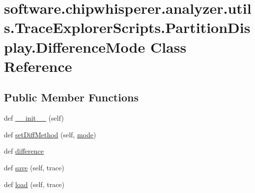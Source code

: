 \hypertarget{classsoftware_1_1chipwhisperer_1_1analyzer_1_1utils_1_1TraceExplorerScripts_1_1PartitionDisplay_1_1DifferenceMode}{}\section{software.\+chipwhisperer.\+analyzer.\+utils.\+Trace\+Explorer\+Scripts.\+Partition\+Display.\+Difference\+Mode Class Reference}
\label{classsoftware_1_1chipwhisperer_1_1analyzer_1_1utils_1_1TraceExplorerScripts_1_1PartitionDisplay_1_1DifferenceMode}
\subsection*{Public Member Functions}
\begin{DoxyCompactItemize}
\item 
def \hyperlink{classsoftware_1_1chipwhisperer_1_1analyzer_1_1utils_1_1TraceExplorerScripts_1_1PartitionDisplay_1_1DifferenceMode_ac95af7f58a38e1dabe01edbc47f40ac0}{\+\_\+\+\_\+init\+\_\+\+\_\+} (self)
\item 
def \hyperlink{classsoftware_1_1chipwhisperer_1_1analyzer_1_1utils_1_1TraceExplorerScripts_1_1PartitionDisplay_1_1DifferenceMode_a47991e7827b698607e369f43a2687a70}{set\+Diff\+Method} (self, \hyperlink{classsoftware_1_1chipwhisperer_1_1analyzer_1_1utils_1_1TraceExplorerScripts_1_1PartitionDisplay_1_1DifferenceMode_a877d514ea60f264b7e82f6077d12d67a}{mode})
\item 
def \hyperlink{classsoftware_1_1chipwhisperer_1_1analyzer_1_1utils_1_1TraceExplorerScripts_1_1PartitionDisplay_1_1DifferenceMode_a28304848515eee73c57ecd33e8ae71e8}{difference}
\item 
def \hyperlink{classsoftware_1_1chipwhisperer_1_1analyzer_1_1utils_1_1TraceExplorerScripts_1_1PartitionDisplay_1_1DifferenceMode_a0356026ae295451eff8476b3455728a4}{save} (self, trace)
\item 
def \hyperlink{classsoftware_1_1chipwhisperer_1_1analyzer_1_1utils_1_1TraceExplorerScripts_1_1PartitionDisplay_1_1DifferenceMode_a5affcdb38770853702d6a1f0ef09b79c}{load} (self, trace)
\end{DoxyCompactItemize}
